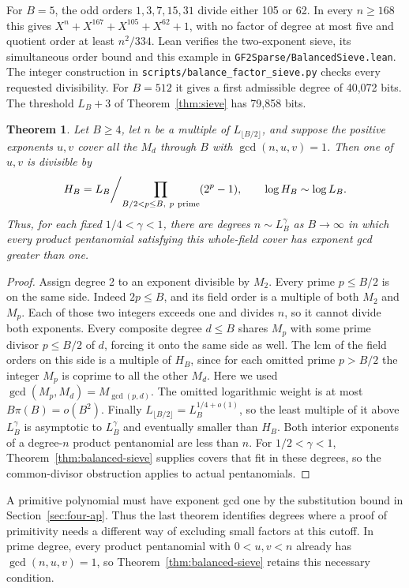 \documentclass[11pt]{article}
\newtheorem{theorem}{Theorem}
\begin{document}
For \(B=5\), the odd orders \(1,3,7,15,31\) divide either 105 or 62.
In every \(n\ge168\) this gives \(X^n+X^{167}+X^{105}+X^{62}+1\),
with no factor of degree at most five and quotient order at least
\(n^2/334\). Lean verifies the two-exponent sieve, its simultaneous
order bound and this example in \nolinkurl{GF2Sparse/BalancedSieve.lean}.
The integer construction in \nolinkurl{scripts/balance_factor_sieve.py}
checks every requested divisibility. For \(B=512\) it gives a first
admissible degree of 40,072 bits. The threshold \(L_B+3\) of
Theorem~\ref{thm:sieve} has 79,858 bits.


\begin{theorem}\label{thm:balanced-gcd}
Let \(B\ge4\), let \(n\) be a multiple of \(L_{\lfloor B/2\rfloor}\),
and suppose the positive exponents \(u,v\) cover all the \(M_d\)
through \(B\) with \(\gcd(n,u,v)=1\). Then one of \(u,v\) is
divisible by
\[
       H_B= L_B\bigg/\!\prod_{B/2<p\le B,\ p\ {\rm prime}}(2^p-1),
       \qquad \log H_B\sim\log L_B .
\]
Thus, for each fixed \(1/4<\gamma<1\), there are degrees
\(n\sim L_B^\gamma\) as \(B\to\infty\) in which every product
pentanomial satisfying this whole-field cover has exponent gcd
greater than one.
\end{theorem}
\begin{proof}
Assign degree 2 to an exponent divisible by \(M_2\). Every prime
\(p\le B/2\) is on the same side. Indeed \(2p\le B\), and its field
order is a multiple of both \(M_2\) and \(M_p\). Each of those two
integers exceeds one and divides \(n\), so it cannot divide both
exponents. Every composite degree \(d\le B\) shares \(M_p\) with some
prime divisor \(p\le B/2\) of \(d\), forcing it onto the same side
as well. The lcm of the field orders on this side is a multiple of
\(H_B\), since for each omitted prime \(p>B/2\) the integer \(M_p\)
is coprime to all the other \(M_d\). Here we used
\(\gcd(M_p,M_d)=M_{\gcd(p,d)}\).
The omitted logarithmic weight is at most \(B\pi(B)=o(B^2)\).
Finally \(L_{\lfloor B/2\rfloor}=L_B^{1/4+o(1)}\), so the least
multiple of it above \(L_B^\gamma\) is asymptotic to \(L_B^\gamma\)
and eventually smaller than \(H_B\). Both interior exponents of a
degree-\(n\) product pentanomial are less than \(n\). For
\(1/2<\gamma<1\), Theorem~\ref{thm:balanced-sieve} supplies covers
that fit in these degrees, so the common-divisor obstruction applies
to actual pentanomials.
\end{proof}

A primitive polynomial must have exponent gcd one by the substitution
bound in Section~\ref{sec:four-ap}. Thus the last theorem identifies
degrees where a proof of primitivity needs a different way of excluding
small factors at this cutoff. In prime degree, every product
pentanomial with \(0<u,v<n\) already has \(\gcd(n,u,v)=1\), so
Theorem~\ref{thm:balanced-sieve} retains this necessary condition.
\end{document}

